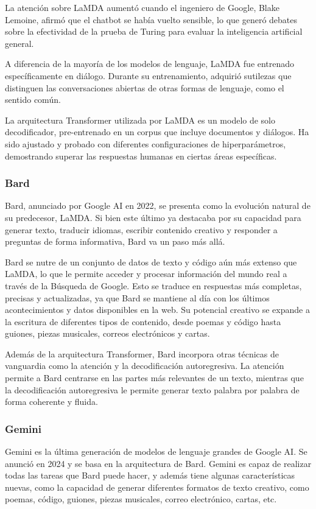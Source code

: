La atención sobre LaMDA aumentó cuando el ingeniero de Google, Blake Lemoine, afirmó que el chatbot se había vuelto sensible, lo que generó debates sobre la efectividad de la prueba de Turing para evaluar la inteligencia artificial general.

A diferencia de la mayoría de los modelos de lenguaje, LaMDA fue entrenado específicamente en diálogo. Durante su entrenamiento, adquirió sutilezas que distinguen las conversaciones abiertas de otras formas de lenguaje, como el sentido común.

La arquitectura Transformer utilizada por LaMDA es un modelo de solo decodificador, pre-entrenado en un corpus que incluye documentos y diálogos. Ha sido ajustado y probado con diferentes configuraciones de hiperparámetros, demostrando superar las respuestas humanas en ciertas áreas específicas.

\subsubsection{Bard}

Bard, anunciado por Google AI en 2022, se presenta como la evolución natural de su predecesor, LaMDA. Si bien este último ya destacaba por su capacidad para generar texto, traducir idiomas, escribir contenido creativo y responder a preguntas de forma informativa, Bard va un paso más allá. 

Bard se nutre de un conjunto de datos de texto y código aún más extenso que LaMDA, lo que le permite acceder y procesar información del mundo real a través de la Búsqueda de Google. Esto se traduce en respuestas más completas, precisas y actualizadas, ya que Bard se mantiene al día con los últimos acontecimientos y datos disponibles en la web. Su potencial creativo se expande a la escritura de diferentes tipos de contenido, desde poemas y código hasta guiones, piezas musicales, correos electrónicos y cartas. 

Además de la arquitectura Transformer, Bard incorpora otras técnicas de vanguardia como la atención y la decodificación autoregresiva. La atención permite a Bard centrarse en las partes más relevantes de un texto, mientras que la decodificación autoregresiva le permite generar texto palabra por palabra de forma coherente y fluida.

\subsubsection{Gemini}
Gemini es la última generación de modelos de lenguaje grandes de Google AI. Se anunció en 2024 y se basa en la arquitectura de Bard. Gemini es capaz de realizar todas las tareas que Bard puede hacer, y además tiene algunas características nuevas, como la capacidad de generar diferentes formatos de texto creativo, como poemas, código, guiones, piezas musicales, correo electrónico, cartas, etc. 

